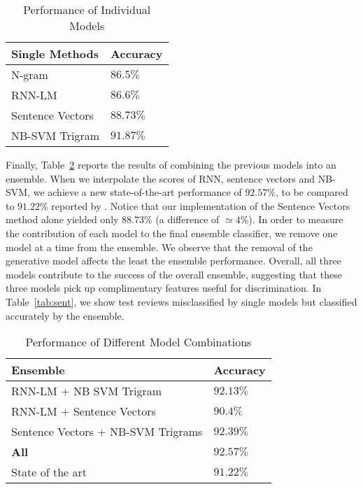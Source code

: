 \documentclass{article} %
\begin{document}
\begin{table}[t]
\caption{Performance of Individual Models}
\label{tab:individual}
\begin{center}
\begin{tabular}{ll}
\hline
Single Methods & Accuracy \\
\hline
N-gram & $86.5\%$ \\
RNN-LM & $86.6\%$ \\
Sentence Vectors & $88.73\%$ \\
NB-SVM Trigram & $91.87\%$ \\
\hline
\end{tabular}
\end{center}
\end{table}

Finally, Table~\ref{tab:ensemble} reports the results of combining the previous
models into an ensemble. When we interpolate the scores of RNN, sentence
vectors and NB-SVM, we achieve a new state-of-the-art performance of $92.57\%$,
to be compared to $91.22\%$ reported by \citep{Wang2012}. Notice that our
implementation of the Sentence Vectors method \citep{Le2014} alone yielded only
$88.73\%$ (a difference of $\simeq 4\%$).  In order to measure the contribution
of each model to the final ensemble classifier, we remove one model at a time
from the ensemble. We observe that the removal of the generative model affects
the least the ensemble performance.  Overall, all three models contribute to
the success of the overall ensemble, suggesting that these three models pick up
complimentary features useful for discrimination. In Table~\ref{tab:sent}, we
show test reviews misclassified by single models but classified accurately by
the ensemble.

\begin{table}[t]
\caption{Performance of Different Model Combinations}
\label{tab:ensemble}
\begin{center}
\begin{tabular}{ll}
\hline
Ensemble & Accuracy \\
\hline
RNN-LM + NB SVM Trigram & $92.13\%$ \\ 
RNN-LM + Sentence Vectors & $90.4\%$ \\
Sentence Vectors + NB-SVM Trigrams & $92.39\%$ \\
{\bf All} & $\mathbf{92.57\%}$ \\
State of the art & $91.22\%$ \\
\hline
\end{tabular}
\end{center}
\end{table}
\end{document}
